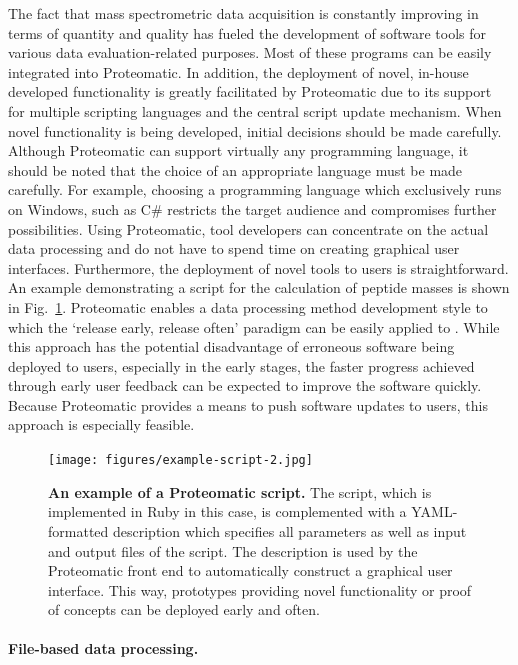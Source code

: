 The fact that mass spectrometric data acquisition is constantly improving in
terms of quantity and quality has fueled the development of software tools for
various data evaluation-related purposes.
Most of these programs can be easily integrated into Proteomatic.
In addition, the deployment of novel, in-house developed functionality is
greatly facilitated by Proteomatic due to its support for multiple scripting
languages and the central script update mechanism.
When novel functionality is being developed, initial decisions should be made 
carefully.
Although Proteomatic can support virtually any programming language, it should
be noted that the choice of an appropriate language must be made carefully.
For example, choosing a programming language which exclusively runs on Windows,
such as C\# restricts the target audience and compromises further possibilities.
Using Proteomatic, tool developers can concentrate on the actual data 
processing and do not have to spend time on creating graphical user interfaces.
Furthermore, the deployment of novel tools to users is straightforward.
An example demonstrating a script for the calculation of peptide masses is 
shown in Fig.~\ref{fig:rapid-development}.
Proteomatic enables a data processing method development style to which the
`release early, release often' paradigm can be easily applied to 
\citep{Raymond2001}.
While this approach has the potential disadvantage of erroneous software
being deployed to users, especially in the early stages, the faster progress
achieved through early user feedback can be expected to improve the software
quickly.
Because Proteomatic provides a means to push software updates to users,
this approach is especially feasible.

\begin{figure}
\texttt{[image: figures/example-script-2.jpg]}
\caption{
{\bf An example of a Proteomatic script.} 
The script, which is implemented in Ruby in this case, is complemented with
a YAML-formatted description which specifies all parameters as well as input
and output files of the script.
The description is used by the Proteomatic front end to automatically construct 
a graphical user interface. This way, prototypes providing novel functionality
or proof of concepts can be deployed early and often.
}
\label{fig:rapid-development}
\end{figure}

\paragraph{File-based data processing.}

